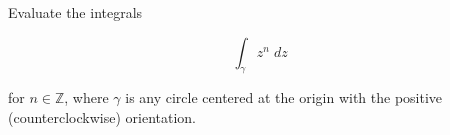 Evaluate the integrals

$$
\int_{\gamma} z^n \; dz
$$

for $n \in \mathbb{Z}$, where $\gamma$ is any circle centered at the origin with the positive (counterclockwise) 
orientation.

\begin{solution}
    \ \\
\end{solution}